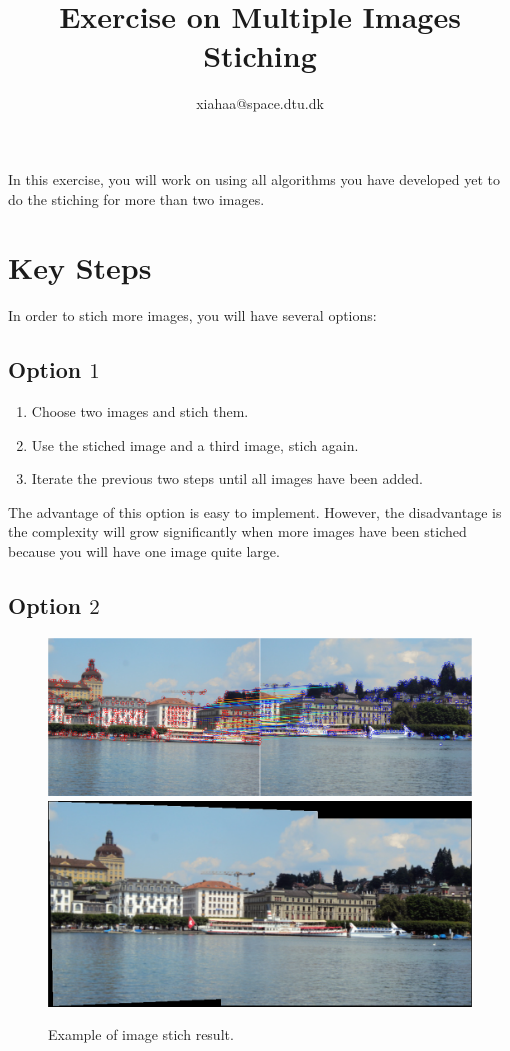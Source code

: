 \documentclass[a4paper]{article}
\begin{document}
\title{Exercise on Multiple Images Stiching}
\author{xiahaa@space.dtu.dk}
\maketitle%

In this exercise, you will work on using all algorithms you have developed yet to do the stiching for more than two images.

\section{Key Steps}
In order to stich more images, you will have several options:
\subsection{Option $1$}
\begin{enumerate}
\item Choose two images and stich them.
\item Use the stiched image and a third image, stich again.
\item Iterate the previous two steps until all images have been added.
\end{enumerate}
The advantage of this option is easy to implement. However, the disadvantage is the complexity will grow significantly when more images have been stiched because you will have one image quite large.

\subsection{Option $2$}


\begin{figure}[!b]
	\centering
	\includegraphics[scale=0.5]{figures/inlier_matches.png}
	\includegraphics[scale=0.5]{figures/stcih_blend.png}
	\caption{Example of image stich result.}
\end{figure}
\end{document}
